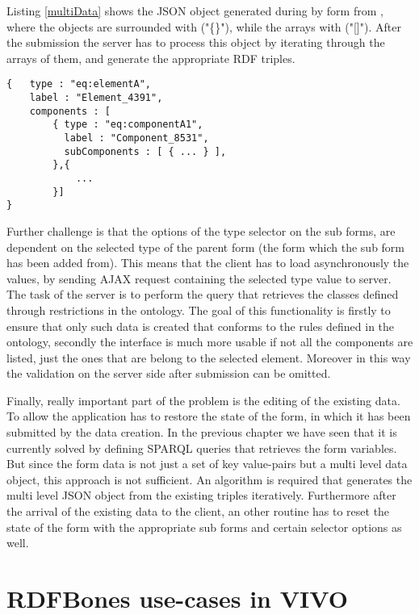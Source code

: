 Listing \ref{multiData} shows the JSON object generated during by form from , where the objects are surrounded with ("\{\}"), while the arrays with ("[]"). After the submission the server has to process this object by iterating through the arrays of them, and generate the appropriate RDF triples.

\begin{lstlisting}[basicstyle=\footnotesize, frame=single, caption={Multi level form data in JSON}, label=multiData, captionpos=b, belowskip=1em, aboveskip=2em]
{	type : "eq:elementA",
	label : "Element_4391",
	components : [
		{ type : "eq:componentA1",
		  label : "Component_8531",	
		  subComponents : [ { ... } ],
		},{ 
			... 
		}]
}
\end{lstlisting}

Further challenge is that the options of the type selector on the sub forms, are dependent on the selected type of the parent form (the form which the sub form has been added from). This means that the client has to load asynchronously the values, by sending AJAX request containing the selected type value to server. The task of the server is to perform the query that retrieves the classes defined through restrictions in the ontology. The goal of this functionality is firstly to ensure that only such data is created that conforms to the rules defined in the ontology, secondly the interface is much more usable if not all the components are listed, just the ones that are belong to the selected element. Moreover in this way the validation on the server side after submission can be omitted.

Finally, really important part of the problem is the editing of the existing data. To allow the application has to restore the state of the form, in which it has been submitted by the data creation. In the previous chapter we have seen that it is currently solved by defining  SPARQL queries that retrieves the form variables. But since the form data is not just a set of key value-pairs but a multi level data object, this approach is not sufficient. An algorithm is required that generates the multi level JSON object from the existing triples iteratively. Furthermore after the arrival of the existing data to the client, an other routine has to reset the state of the form with the appropriate sub forms and certain selector options as well.

\section{RDFBones use-cases in VIVO}

